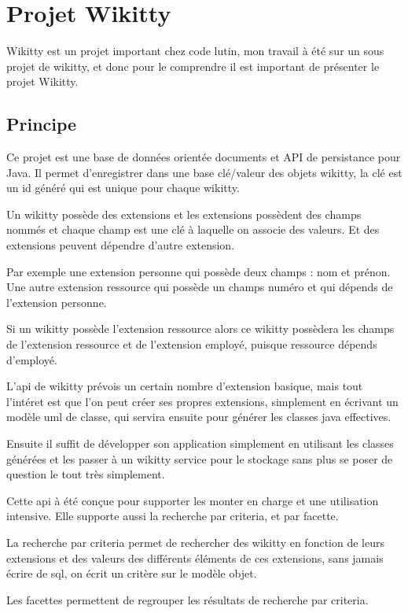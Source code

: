 \section{Projet Wikitty}

Wikitty est un projet important chez code lutin, mon travail à été sur un sous
projet de wikitty, et donc pour le comprendre il est important de présenter
le projet Wikitty.


\subsection{Principe}

Ce projet est une base de données orientée documents et API de persistance pour
Java. Il permet d'enregistrer dans une base clé/valeur des objets wikitty, la
clé est un id généré qui est unique pour chaque wikitty. 

Un wikitty possède des extensions et les extensions possèdent des champs nommés
et chaque champ est une clé à laquelle on associe des valeurs. Et des extensions
peuvent dépendre d'autre extension.

Par exemple une extension personne qui possède deux champs : nom et prénon.
Une autre extension ressource qui possède un champs numéro et qui dépends de
l'extension personne.

Si un wikitty possède l'extension ressource alors ce wikitty possèdera les
champs de l'extension ressource et de l'extension employé, puisque ressource
dépends d'employé.

L'api de wikitty prévois un certain nombre d'extension basique, mais tout
l'intéret est que l'on peut créer ses propres extensions, simplement en écrivant
un modèle uml de classe, qui servira ensuite pour générer les classes java
effectives.

Ensuite il suffit de développer son application simplement en utilisant les
classes générées et les passer à un wikitty service pour le stockage sans plus
se poser de question le tout très simplement.

Cette api à été conçue pour supporter les monter en charge et une utilisation
intensive. Elle supporte aussi la recherche par criteria, et par facette.

La recherche par criteria permet de rechercher des wikitty en fonction de leurs
extensions et des valeurs des différents éléments de ces extensions, sans jamais
écrire de sql, on écrit un critère sur le modèle objet. 

Les facettes permettent de regrouper les résultats de recherche par criteria. 

